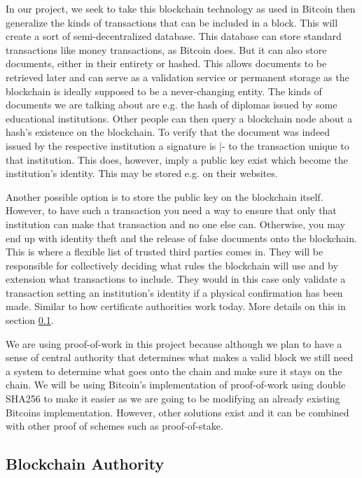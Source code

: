 \documentclass[12pt]{article}
\begin{document}
In our project, we seek to take this blockchain technology as used in Bitcoin then generalize the kinds of transactions that can be included in a block. This will create a sort of semi-decentralized database. This database can store standard transactions like money transactions, as Bitcoin does. But it can also store documents, either in their entirety or hashed. This allows documents to be retrieved later and can serve as a validation service or permanent storage as the blockchain is ideally supposed to be a never-changing entity. The kinds of documents we are talking about are e.g. the hash of diplomas issued by some educational institutions. Other people can then query a blockchain node about a hash's existence on the blockchain. To verify that the document was indeed issued by the respective institution a signature is |- to the transaction unique to that institution. This does, however, imply a public key exist which become the institution's identity. This may be stored e.g. on their websites.

Another possible option is to store the public key on the blockchain itself. However, to have such a transaction you need a way to ensure that only that institution can make that transaction and no one else can. Otherwise, you may end up with identity theft and the release of false documents onto the blockchain. This is where a flexible list of trusted third parties comes in. They will be responsible for collectively deciding what rules the blockchain will use and by extension what transactions to include. They would in this case only validate a transaction setting an institution's identity if a physical confirmation has been made. Similar to how certificate authorities work today. More details on this in section \ref{subsec:authority}.


We are using proof-of-work in this project because although we plan to have a sense of central authority that determines what makes a valid block we still need a system to determine what goes onto the chain and make sure it stays on the chain. We will be using Bitcoin's implementation of proof-of-work using double SHA256 to make it easier as we are going to be modifying an already existing Bitcoins implementation. However, other solutions exist and it can be combined with other proof of schemes such as proof-of-stake.

\subsection{Blockchain Authority}\label{subsec:authority}
\end{document}
